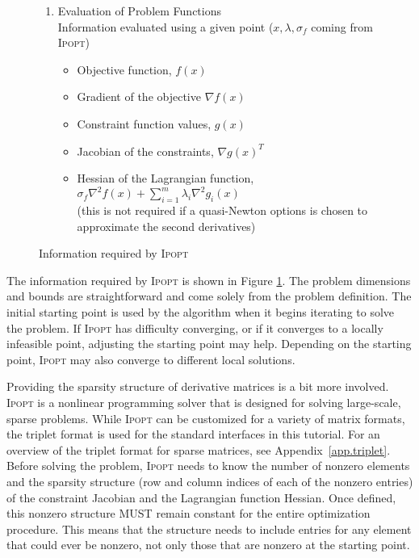 \documentclass[10pt]{article}
\newcommand{\Ipopt}{\textsc{Ipopt}\xspace}
\begin{document}
\begin{figure}
\begin{enumerate}
\item Evaluation of Problem Functions \label{it.prob_eval} \\
  Information evaluated using a given point ($x,
  \lambda, \sigma_f$ coming from \Ipopt)
  \begin{itemize}
  \item Objective function, $f(x)$
  \item Gradient of the objective $\nabla f(x)$
  \item Constraint function values, $g(x)$
  \item Jacobian of the constraints, $\nabla g(x)^T$
  \item Hessian of the Lagrangian function, 
    $\sigma_f \nabla^2 f(x) + \sum_{i=1}^m\lambda_i\nabla^2
    g_i(x)$ \\
    (this is not required if a quasi-Newton options is chosen to
    approximate the second derivatives)
  \end{itemize}
\end{enumerate}
\caption{Information required by \Ipopt}
\label{fig.required_info}
\end{figure}
The information required by \Ipopt is shown in Figure
\ref{fig.required_info}. The problem dimensions and bounds are
straightforward and come solely from the problem definition. The
initial starting point is used by the algorithm when it begins
iterating to solve the problem. If \Ipopt has difficulty converging, or
if it converges to a locally infeasible point, adjusting the starting
point may help.  Depending on the starting point, \Ipopt may also
converge to different local solutions.

Providing the sparsity structure of derivative matrices is a bit more
involved. \Ipopt is a nonlinear programming solver that is designed
for solving large-scale, sparse problems. While \Ipopt can be
customized for a variety of matrix formats, the triplet format is used
for the standard interfaces in this tutorial. For an overview of the
triplet format for sparse matrices, see Appendix~\ref{app.triplet}.
Before solving the problem, \Ipopt needs to know the number of
nonzero elements and the sparsity structure (row and column indices of
each of the nonzero entries) of the constraint Jacobian and the
Lagrangian function Hessian. Once defined, this nonzero structure MUST
remain constant for the entire optimization procedure. This means that
the structure needs to include entries for any element that could ever
be nonzero, not only those that are nonzero at the starting point.
\end{document}
